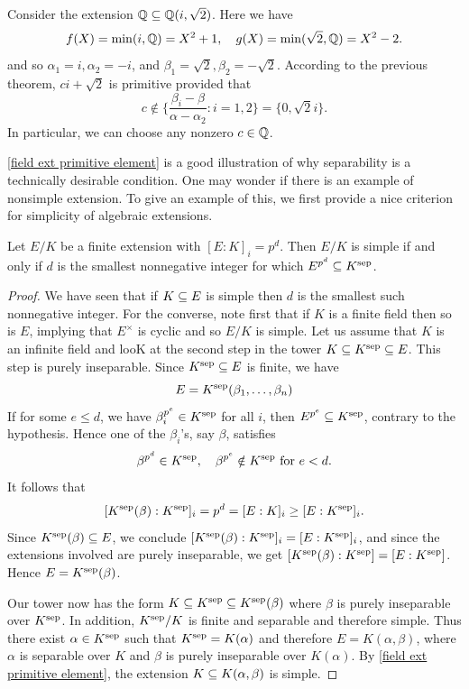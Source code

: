 \begin{example}
Consider the extension $\mathbb{Q}\subseteq\mathbb{Q}(i,\sqrt{2})$. Here we have
\[f(X)=\min(i,\mathbb{Q})=X^2+1,\quad g(X)=\min(\sqrt{2},\mathbb{Q})=X^2-2.\]
and so $\alpha_1=i,\alpha_2=-i$, and $\beta_1=\sqrt{2},\beta_2=-\sqrt{2}$.  According to the previous theorem, $ci+\sqrt{2}$ is primitive provided that
\[c\notin\Big\{\frac{\beta_i-\beta}{\alpha-\alpha_2}:i=1,2\Big\}=\{0,\sqrt{2}i\}.\]
In particular, we can choose any nonzero $c\in\mathbb{Q}$.
\end{example}
\cref{field ext primitive element} is a good illustration of why separability is a technically desirable condition. One may wonder if there is an example of nonsimple extension. To give an example of this, we first provide a nice criterion for simplicity of algebraic extensions.
\begin{proposition}\label{field ext finite is simple iff radical exponent}
Let $E/K$ be a finite extension with $[E:K]_i=p^d$. Then $E/K$ is simple if and only if $d$ is the smallest nonnegative integer for which $E^{p^d}\subseteq K^{\mathrm{sep}}$.
\end{proposition}
\begin{proof}
We have seen that if $K\subseteq E$ is simple then $d$ is the smallest such nonnegative integer. For the converse, note first that if $K$ is a finite field then so is $E$, implying that $E^\times$ is cyclic and so $E/K$ is simple. Let us assume that $K$ is an infinite field and looK at the second step in the tower $K\subseteq K^{\mathrm{sep}}\subseteq E$. This step is purely inseparable. Since $K^{\mathrm{sep}}\subseteq E$ is finite, we have
\[E=K^{\mathrm{sep}}(\beta_1,\dots,\beta_n)\]
If for some $e\leq d$, we have $\beta_i^{p^e}\in K^{\mathrm{sep}}$ for all $i$, then $E^{p^e}\subseteq K^{\mathrm{sep}}$, contrary to the hypothesis. Hence one of the $\beta_i$'s, say $\beta$, satisfies
\[\beta^{p^d}\in K^{\mathrm{sep}},\quad \beta^{p^e}\notin K^{\mathrm{sep}}\text{ for }e<d.\]
It follows that
\[[K^{\mathrm{sep}}(\beta):K^{\mathrm{sep}}]_i=p^d=[E:K]_i\geq[E:K^{\mathrm{sep}}]_i.\]
Since $K^{\mathrm{sep}}(\beta)\subseteq E$, we conclude $[K^{\mathrm{sep}}(\beta):K^{\mathrm{sep}}]_i=[E:K^{\mathrm{sep}}]_i$, and since the extensions involved are purely inseparable, we get $[K^{\mathrm{sep}}(\beta):K^{\mathrm{sep}}]=[E:K^{\mathrm{sep}}]$. Hence $E=K^{\mathrm{sep}}(\beta)$.\par
Our tower now has the form $K\subseteq K^{\mathrm{sep}}\subseteq K^{\mathrm{sep}}(\beta)$ where $\beta$ is purely inseparable over $K^{\mathrm{sep}}$. In addition, $K^{\mathrm{sep}}/K$ is finite and separable and therefore simple. Thus there exist $\alpha\in K^{\mathrm{sep}}$ such that $K^{\mathrm{sep}}=K(\alpha)$ and therefore $E=K(\alpha,\beta)$, where $\alpha$ is separable over $K$ and $\beta$ is purely inseparable over $K(\alpha)$. By \cref{field ext primitive element}, the extension $K\subseteq K(\alpha,\beta)$ is simple.
\end{proof}

